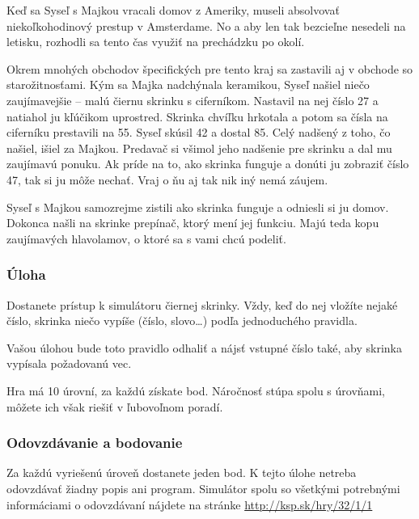 Keď sa Syseľ s Majkou vracali domov z Ameriky, museli absolvovať
niekoľkohodinový prestup v Amsterdame. No a aby len tak bezcieľne
nesedeli na letisku, rozhodli sa tento čas využiť na prechádzku po
okolí.

Okrem mnohých obchodov špecifických pre tento kraj sa zastavili aj v
obchode so starožitnosťami. Kým sa Majka nadchýnala keramikou, Syseľ
našiel niečo zaujímavejšie -- malú čiernu skrinku s ciferníkom. Nastavil
na nej číslo 27 a natiahol ju kľúčikom uprostred. Skrinka chvíľku
hrkotala a potom sa čísla na ciferníku prestavili na 55. Syseľ skúsil 42
a dostal 85. Celý nadšený z toho, čo našiel, išiel za Majkou. Predavač
si všimol jeho nadšenie pre skrinku a dal mu zaujímavú ponuku. Ak príde
na to, ako skrinka funguje a donúti ju zobraziť číslo 47, tak si ju môže
nechať. Vraj o ňu aj tak nik iný nemá záujem.

Syseľ s Majkou samozrejme zistili ako skrinka funguje a odniesli si ju
domov. Dokonca našli na skrinke prepínač, ktorý mení jej funkciu. Majú
teda kopu zaujímavých hlavolamov, o ktoré sa s vami chcú podeliť.

\subsubsection{Úloha}

Dostanete prístup k simulátoru čiernej skrinky. Vždy, keď do nej vložíte
nejaké číslo, skrinka niečo vypíše (číslo, slovo\dots) podľa
jednoduchého pravidla.

Vašou úlohou bude toto pravidlo odhaliť a nájsť vstupné číslo také, aby
skrinka vypísala požadovanú vec.

Hra má 10 úrovní, za každú získate bod. Náročnosť stúpa spolu s
úrovňami, môžete ich však riešiť v ľubovoľnom poradí.

\subsubsection{Odovzdávanie a bodovanie}

Za každú vyriešenú úroveň dostanete jeden bod. K tejto úlohe netreba
odovzdávať žiadny popis ani program. Simulátor spolu so všetkými
potrebnými informáciami o odovzdávaní nájdete na stránke
\url{http://ksp.sk/hry/32/1/1}
